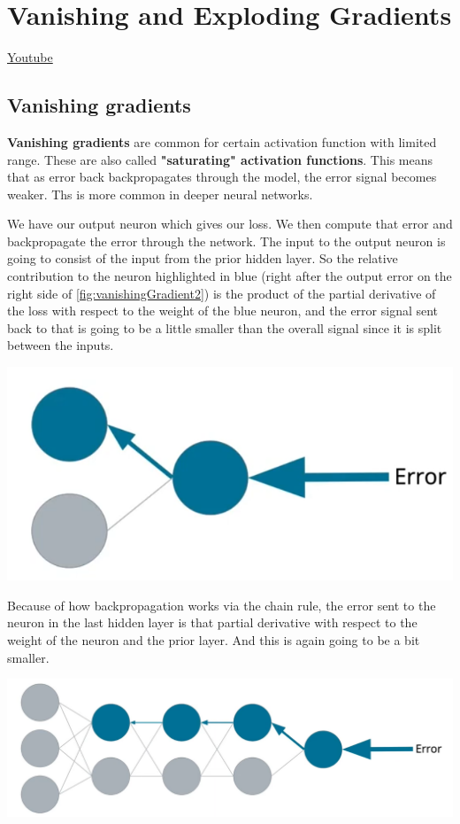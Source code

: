 \section{Vanishing and Exploding Gradients}
\href{https://www.youtube.com/watch?v=ff3GFgnE4PU&t=62s&ab_channel=Udacity}{Youtube} \newline

\subsection{Vanishing gradients}
\textbf{Vanishing gradients} are common for certain activation function with limited range. These are also called \textbf{"saturating" activation functions}. This means that as error back backpropagates through the model, the error signal becomes weaker. Ths is more common in deeper neural networks. 

We have our output neuron which gives our loss. We then compute that error and backpropagate the error through the network. The input to the output neuron is going to consist of the input from the prior hidden layer. So the relative contribution to the neuron highlighted in blue (right after the output error on the right side of \autoref{fig:vanishingGradient2}) is the product of the partial derivative of the loss with respect to the weight of the blue neuron, and the error signal sent back to that is going to be a little smaller than the overall signal since it is split between the inputs. 

\includegraphics[width=0.75\linewidth]{img//intro//trainingNN/image2.png}
\label{fig:vanishingGradient2}

Because of how backpropagation works via the chain rule, the error sent to the neuron in the last hidden layer is that partial derivative with respect to the weight of the neuron and the prior layer. And this is again going to be a bit smaller. 

\includegraphics[width=1\linewidth]{img//intro//trainingNN/image3.png}

